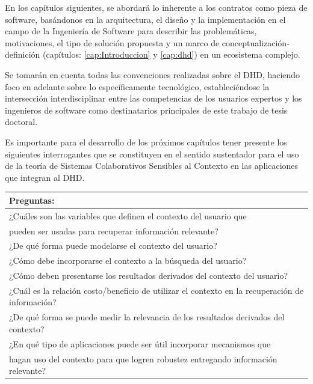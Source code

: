 En los capítulos siguientes, se abordará lo inherente a los contratos como pieza de software, basándonos en la arquitectura, el diseño y la implementación en el campo de la Ingeniería de Software para describir las problemáticas, motivaciones,
el tipo de solución propuesta y un marco de conceptualización-definición (capítulos: \ref{cap:Introduccion} y \ref{cap:dhd}) en un ecosistema complejo. 


Se tomarán en cuenta todas las convenciones realizadas sobre el DHD, haciendo foco en adelante sobre lo específicamente tecnológico, estableciéndose la intersección interdisciplinar entre las competencias de los usuarios expertos y los ingenieros de software como destinatarios principales de este trabajo de tesis doctoral. 

Es importante para el desarrollo de los próximos capítulos tener presente los siguientes interrogantes que se constituyen en el sentido sustentador para el uso de la teoría de Sistemas Colaborativos Sensibles al Contexto en las aplicaciones que integran al DHD. 


\begin{center}

\begin{tabular}[t]{|l|}
\hline
Preguntas: \\
\hline


\item ¿Cuáles son las variables que definen el contexto del usuario que \\
pueden ser usadas para recuperar información relevante? \\
\hline
\item ¿De qué forma puede modelarse el contexto del usuario? \\
\hline
\item ¿Cómo debe incorporarse el contexto a la búsqueda del usuario?\\
\hline
\item ¿Cómo deben presentarse los resultados derivados del contexto del
usuario?\\
\hline
\item ¿Cuál es la relación costo/beneficio de utilizar el contexto en la
recuperación de información?\\
\hline
\item ¿De qué forma se puede medir la relevancia de los resultados derivados del
contexto?\\
\hline
\item ¿En qué tipo de aplicaciones puede ser útil incorporar mecanismos
que\\
hagan uso del contexto para que logren robustez entregando información
relevante?\\
\hline


\end{tabular}
\end{center}



